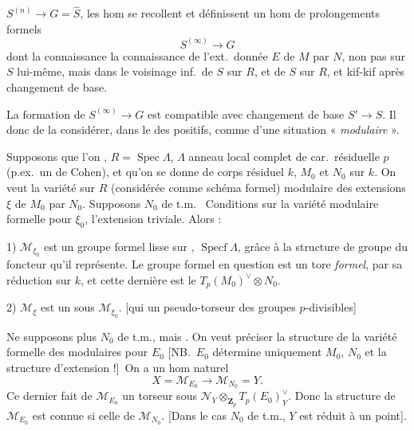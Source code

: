 \documentclass[11pt,a4paper]{article}
\begin{document}
$S^{(n)}\to G=\widehat{S}$,  les hom
se recollent et définissent un hom de prolongements formels
\[
  S^{(\infty)}\longrightarrow G
\]
dont la connaissance \struck{\ill{}}  la
connaissance de l'ext.\ donnée $E$ de $M$ par $N$, non pas sur $S$
lui-même, mais dans le voisinage inf.\ de $S$ sur $R$, et \ill{} \ill{}
\ill{} \ill{} de $S$ sur $R$, et kif-kif après changement de base.

La formation de $S^{(\infty)}\to G$ est compatible avec changement de base
\struck{\ill{}} $S'\to S$. Il \ill{} \ill{} donc de la considérer, dans le
\ill{} des positifs, comme  d'une situation
« \emph{modulaire} ».

Supposons \struck{\ill{}}  que l'on \ill{}
\add{\ill{}} \ill{}, $R=\operatorname{Spec}\Lambda$, $\Lambda$ anneau local
complet de car.\ résiduelle $p$ (p.ex.\ un \ill{} de Cohen), et qu'on se
donne \ill{} de corps résiduel $k$, $M_0$ et $N_0$ sur $k$. On veut la
variété   sur $R$ (considérée comme
schéma formel) modulaire \add{\ill{}} des extensions \ill{} $\xi$ de
$M_0$ par $N_0$. Supposons $N_0$ de t.m.\ \struck{\ill{}} Conditions sur la
variété modulaire formelle pour $\xi_0$, l'extension triviale.
\struck{\ill{}} Alors :

1) $\mathcal{M}_{\xi_0}$ est un groupe formel lisse
sur , $\operatorname{Specf}\Lambda$, grâce à la structure de
groupe du foncteur qu'il représente. Le groupe formel en question est un
tore \emph{formel},   par sa réduction sur $k$, et cette dernière est le
\add{\ill{}} 
$T_p(M_0)^{\vee}\otimes N_0$.

2) $\mathcal{M}_\xi$ est un 
 sous $\mathcal{M}_{\xi_0}$. [qui \ill{} \ill{} \ill{} \ill{}
\ill{} un pseudo-torseur  \ill{} des groupes 
$p$-divisibles]

Ne supposons plus \ill{} $N_0$ de t.m., mais \ill{} .
On veut préciser la structure de la variété formelle des modulaires pour
$E_0$ [NB.\ $E_0$ détermine uniquement $M_0$, $N_0$ et la structure
d'extension !]\ On a un hom naturel
\[
  X=\mathcal{M}_{E_0}\longrightarrow\mathcal{M}_{N_0}=Y .
\]
Ce dernier fait de $\mathcal{M}_{E_0}$ un  torseur
 sous
$\mathcal{N}_Y\otimes_{\mathbf{Z}_p}T_p(E_0)^{\vee}_Y$. Donc la structure
de  $\mathcal{M}_{E_0}$ est connue si celle de
$\mathcal{M}_{N_0}$. [Dans le cas $N_0$ de t.m., $Y$ est réduit à un
point].
\end{document}
